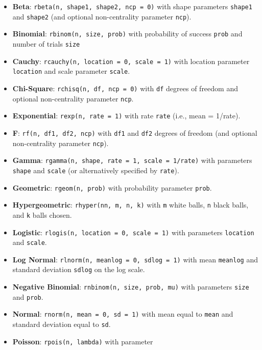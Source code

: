 \documentclass[
  letterpaper,
]{krantz}
\providecommand{\tightlist}{%
  \setlength{\itemsep}{0pt}\setlength{\parskip}{0pt}}\usepackage{longtable,booktabs,array}
\begin{document}
\begin{itemize}
\tightlist
\item
  \textbf{Beta}: \texttt{rbeta(n,\ shape1,\ shape2,\ ncp\ =\ 0)} with
  shape parameters \texttt{shape1} and \texttt{shape2} (and optional
  non-centrality parameter \texttt{ncp}).
\item
  \textbf{Binomial}: \texttt{rbinom(n,\ size,\ prob)} with probability
  of success \texttt{prob} and number of trials \texttt{size}
\item
  \textbf{Cauchy}: \texttt{rcauchy(n,\ location\ =\ 0,\ scale\ =\ 1)}
  with location parameter \texttt{location} and scale parameter
  \texttt{scale}.
\item
  \textbf{Chi-Square}: \texttt{rchisq(n,\ df,\ ncp\ =\ 0)} with
  \texttt{df} degrees of freedom and optional non-centrality parameter
  \texttt{ncp}.
\item
  \textbf{Exponential}: \texttt{rexp(n,\ rate\ =\ 1)} with rate
  \texttt{rate} (i.e., mean = 1/rate).
\item
  \textbf{F}: \texttt{rf(n,\ df1,\ df2,\ ncp)} with \texttt{df1} and
  \texttt{df2} degrees of freedom (and optional non-centrality parameter
  \texttt{ncp}).
\item
  \textbf{Gamma}:
  \texttt{rgamma(n,\ shape,\ rate\ =\ 1,\ scale\ =\ 1/rate)} with
  parameters \texttt{shape} and \texttt{scale} (or alternatively
  specified by \texttt{rate}).
\item
  \textbf{Geometric}: \texttt{rgeom(n,\ prob)} with probability
  parameter \texttt{prob}.
\item
  \textbf{Hypergeometric}: \texttt{rhyper(nn,\ m,\ n,\ k)} with
  \texttt{m} white balls, \texttt{n} black balls, and \texttt{k} balls
  chosen.
\item
  \textbf{Logistic}: \texttt{rlogis(n,\ location\ =\ 0,\ scale\ =\ 1)}
  with parameters \texttt{location} and \texttt{scale}.
\item
  \textbf{Log Normal}: \texttt{rlnorm(n,\ meanlog\ =\ 0,\ sdlog\ =\ 1)}
  with mean \texttt{meanlog} and standard deviation \texttt{sdlog} on
  the log scale.
\item
  \textbf{Negative Binomial}: \texttt{rnbinom(n,\ size,\ prob,\ mu)}
  with parameters \texttt{size} and \texttt{prob}.
\item
  \textbf{Normal}: \texttt{rnorm(n,\ mean\ =\ 0,\ sd\ =\ 1)} with mean
  equal to \texttt{mean} and standard deviation equal to \texttt{sd}.
\item
  \textbf{Poisson}: \texttt{rpois(n,\ lambda)} with parameter

\end{itemize}
\end{document}
